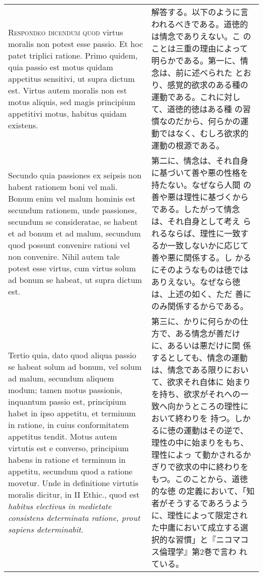 \documentclass[10pt]{jsarticle}
\begin{document}
\begin{longtable}{p{21em}p{21em}}
{\scshape Respondeo dicendum quod} virtus moralis non potest esse
passio. Et hoc patet triplici ratione. Primo quidem, quia passio est
motus quidam appetitus sensitivi, ut supra dictum est. Virtus autem
moralis non est motus aliquis, sed magis principium appetitivi motus,
habitus quidam existens.

&

解答する。以下のように言われるべきである。道徳的は情念でありえない。こ
のことは三重の理由によって明らかである。第一に、情念は、前に述べられた
とおり、感覚的欲求のある種の運動である。これに対して、道徳的徳はある種
の習慣なのだから、何らかの運動ではなく、むしろ欲求的運動の根源である。

 
\\

 Secundo quia passiones ex seipsis non habent rationem boni vel
mali. Bonum enim vel malum hominis est secundum rationem, unde
passiones, secundum se consideratae, se habent et ad bonum et ad
malum, secundum quod possunt convenire rationi vel non
convenire. Nihil autem tale potest esse virtus, cum virtus solum ad
bonum se habeat, ut supra dictum est.


&

第二に、情念は、それ自身に基づいて善や悪の性格を持たない。なぜなら人間
の善や悪は理性に基づくからである。したがって情念は、それ自身として考え
られるならば、理性に一致するか一致しないかに応じて善や悪に関係する。し
かるにそのようなものは徳ではありえない。なぜなら徳は、上述の如く、ただ
善にのみ関係するからである。
 
\\


 Tertio quia, dato quod aliqua passio se habeat solum ad bonum, vel
solum ad malum, secundum aliquem modum; tamen motus passionis,
inquantum passio est, principium habet in ipso appetitu, et terminum
in ratione, in cuius conformitatem appetitus tendit. Motus autem
virtutis est e converso, principium habens in ratione et terminum in
appetitu, secundum quod a ratione movetur. Unde in definitione
virtutis moralis dicitur, in II Ethic., quod est {\itshape habitus
electivus in medietate consistens determinata ratione, prout sapiens
determinabit}.

&

 第三に、かりに何らかの仕方で、ある情念が善だけに、あるいは悪だけに関
 係するとしても、情念の運動は、情念である限りにおいて、欲求それ自体に
 始まりを持ち、欲求がそれへの一致へ向かうところの理性において終わりを
 持つ。しかるに徳の運動はその逆で、理性の中に始まりをもち、理性によっ
 て動かされるかぎりで欲求の中に終わりをもつ。このことから、道徳的な徳
 の定義において、「知者がそうするであろうように、理性によって限定され
 た中庸において成立する選択的な習慣」と『ニコマコス倫理学』第2巻で言わ
 れている。


\end{longtable}
\end{document}
